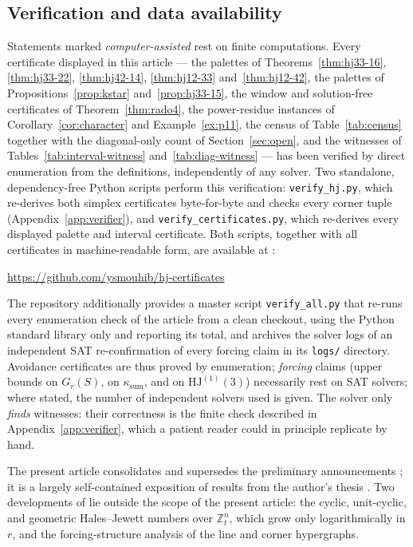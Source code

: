 \documentclass[12pt]{article}
\newcommand{\HJ}{\mathrm{HJ}}
\newcommand{\Z}{\mathbb{Z}}
\newcommand{\ksum}{\kappa_{\mathrm{sum}}}
\begin{document}
\subsection*{Verification and data availability}
Statements marked \emph{computer-assisted} rest on finite computations.
Every certificate displayed in this article --- the palettes of
Theorems~\ref{thm:hj33-16}, \ref{thm:hj33-22}, \ref{thm:hj42-14},
\ref{thm:hj12-33} and~\ref{thm:hj12-42}, the palettes of
Propositions~\ref{prop:kstar} and~\ref{prop:hj33-15}, the window and
solution-free certificates of Theorem~\ref{thm:rado4}, the
power-residue instances of Corollary~\ref{cor:character} and
Example~\ref{ex:p11}, the census of Table~\ref{tab:census} together
with the diagonal-only count of Section~\ref{sec:open}, and the
witnesses of Tables~\ref{tab:interval-witness}
and~\ref{tab:diag-witness} --- has been verified by direct enumeration
from the definitions, independently of any solver. Two standalone,
dependency-free Python scripts perform this verification:
\texttt{verify\_hj.py}, which re-derives both simplex certificates
byte-for-byte and checks every corner tuple
(Appendix~\ref{app:verifier}), and \texttt{verify\_certificates.py},
which re-derives every displayed palette and interval certificate. Both
scripts, together with all certificates in machine-readable form, are
available at \cite{hjcerts}:
\begin{center}
\url{https://github.com/ysmouhib/hj-certificates}
\end{center}
The repository additionally provides a master script
\texttt{verify\_all.py} that re-runs every enumeration check of the
article from a clean checkout, using the Python standard library only
and reporting its total, and archives the solver logs of an independent
SAT re-confirmation of every forcing claim in its \texttt{logs/}
directory.
Avoidance certificates are thus proved by enumeration; \emph{forcing}
claims (upper bounds on $G_{r}(S)$, on $\ksum$, and on $\HJ^{(1)}(3)$)
necessarily rest on SAT solvers; where stated, the number of independent
solvers used is given. The solver only \emph{finds} witnesses: their
correctness is the finite check described in Appendix~\ref{app:verifier},
which a patient reader could in principle replicate by hand.

The present article consolidates and supersedes the preliminary
announcements \cite{mh,mouhib-note}; it is a largely self-contained
exposition of results from the author's thesis \cite{thesis}. Two
developments of \cite{thesis} lie outside the scope of the present
article: the cyclic, unit-cyclic, and geometric Hales--Jewett numbers
over $\Z_{t}^{n}$, which grow only logarithmically in $r$, and the
forcing-structure analysis of the line and corner hypergraphs.
\end{document}
